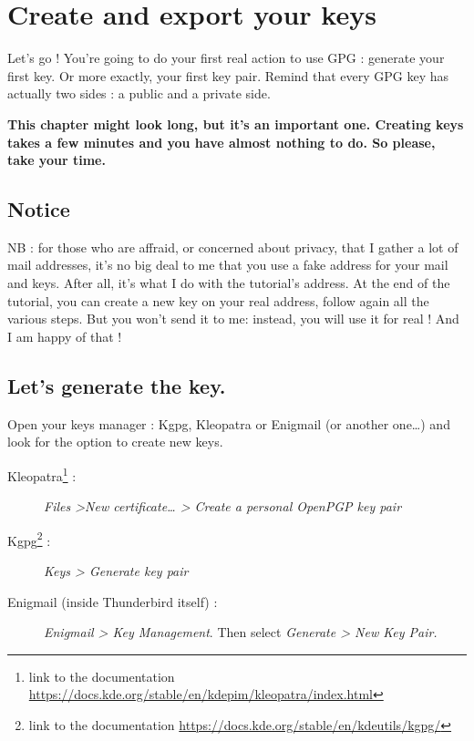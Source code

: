 \chapter{Create and export your keys}

Let's go ! You're going to do your first real action to use GPG :
generate your first key. Or more exactly, your first key pair. Remind
that every GPG key has actually two sides : a public and a private side.

\textbf{This chapter might look long, but it's an important one. Creating keys takes a few minutes and you have almost nothing to do. So
please, take your time.}

\section{Notice}\label{notice}

NB : for those who are affraid, or concerned about privacy, that I gather a lot of mail addresses, it's no big deal to me that you use a
fake address for your mail and keys. After all, it's what I do with the tutorial's address. At the end of the tutorial, you can create a new key on your real address, follow again all the various steps. But you won't send it to me: instead, you will use it for real ! And I am happy of that !

\section{Let's generate the key.}\label{lets-generate-the-key.}

Open your keys manager : Kgpg, Kleopatra or Enigmail (or another
one\ldots{}) and look for the option to create new keys.

\begin{description}
	\item[Kleopatra\footnote{link to the documentation \url{https://docs.kde.org/stable/en/kdepim/kleopatra/index.html}} :] \emph{Files \textgreater New certificate\ldots{} \textgreater{} Create a personal OpenPGP key pair}

\item [Kgpg\footnote{link to the documentation \url{https://docs.kde.org/stable/en/kdeutils/kgpg/}} :] \emph{Keys \textgreater{} Generate key pair}
\item [Enigmail (inside Thunderbird itself) :] \emph{Enigmail \textgreater{} Key Management}. Then select \emph{Generate \textgreater{} New Key Pair.}

\end{description}


